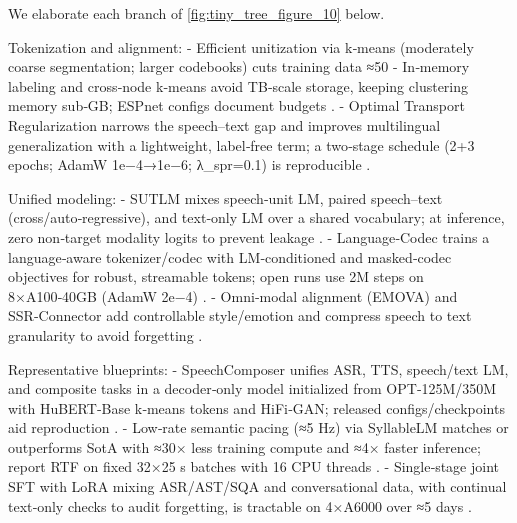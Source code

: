 \documentclass{article}
\begin{document}
We elaborate each branch of \autoref{fig:tiny_tree_figure_10} below.

Tokenization and alignment:
- Efficient unitization via k‑means (moderately coarse segmentation; larger codebooks) cuts training data ≈50%
- In‑memory labeling and cross‑node k‑means avoid TB‑scale storage, keeping clustering memory sub‑GB; ESPnet configs document budgets \cite{chen2023reducingbarriersselfsupervisedlearninghu}.
- Optimal Transport Regularization narrows the speech–text gap and improves multilingual generalization with a lightweight, label‑free term; a two‑stage schedule (2+3 epochs; AdamW 1e−4→1e−6; λ_spr=0.1) is reproducible \cite{xu2025optimaltransportregularizationspeechtext}.

Unified modeling:
- SUTLM mixes speech‑unit LM, paired speech–text (cross/auto‑regressive), and text‑only LM over a shared vocabulary; at inference, zero non‑target modality logits to prevent leakage \cite{entry2025towardjointlanguagemodelingspeechunitste,cuervo2025textspeechlanguagemodelsimprovedcrossmod,wang2024c3llmconditionalmultimodalcontentgenerat}.
- Language‑Codec trains a language‑aware tokenizer/codec with LM‑conditioned and masked‑codec objectives for robust, streamable tokens; open runs use 2M steps on 8×A100‑40GB (AdamW 2e−4) \cite{ji2025languagecodecbridgingdiscreterepresentat,kim2024enclapcombiningneuralaudiocodectextjoint,huang2024repcodecspeechrepresentationcodectokeniz}.
- Omni‑modal alignment (EMOVA) and SSR‑Connector add controllable style/emotion and compress speech to text granularity to avoid forgetting \cite{chen2025emovaempoweringlanguagemodelsseehearspea,tan2025ssralignmentawaremodalityconnectorspeech}.

Representative blueprints:
- SpeechComposer unifies ASR, TTS, speech/text LM, and composite tasks in a decoder‑only model initialized from OPT‑125M/350M with HuBERT‑Base k‑means tokens and HiFi‑GAN; released configs/checkpoints aid reproduction \cite{wu2024speechcomposerunifyingmultiplespeechtask}.
- Low‑rate semantic pacing (≈5 Hz) via SyllableLM matches or outperforms SotA with ≈30× less training compute and ≈4× faster inference; report RTF on fixed 32×25 s batches with 16 CPU threads \cite{baade2024syllablelmlearningcoarsesemanticunitsspe}.
- Single‑stage joint SFT with LoRA mixing ASR/AST/SQA and conversational data, with continual text‑only checks to audit forgetting, is tractable on 4×A6000 over ≈5 days \cite{har-tuv2025pastphoneticacousticspeechtokenizer,hsiao2025analyzingmitigationstrategiescatastrophi}.
\end{document}
